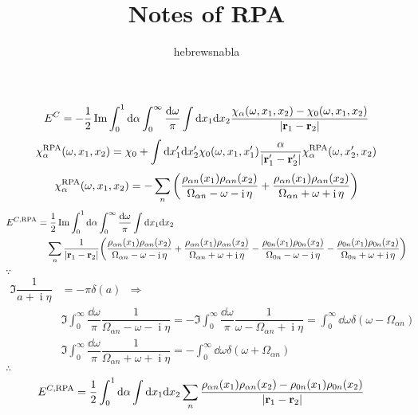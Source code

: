 \documentclass[a4paper]{article}
\title{Notes of RPA}
\author{hebrewsnabla}
\DeclareMathOperator{\I}{\mathrm{i}}
\DeclareMathOperator{\dra}{\;\Rightarrow\;}
\DeclareMathOperator{\RPA}{\mathrm{RPA}}
\numberwithin{equation}{section}
\begin{document}
\maketitle


\begin{equation}\label{key}
E^C = -\dfrac{1}{2}\Im \int_0^1 \dd\alpha \int_0^\infty \dfrac{\dd\omega}{\pi} \int \dd x_1\dd x_2 \dfrac{\chi_\alpha(\omega,x_1,x_2) - \chi_0(\omega,x_1,x_2)}{\abs{\vb{r}_1 - \vb{r}_2}}
\end{equation}
\begin{equation}\label{key}
\chi_\alpha^{\RPA}(\omega,x_1,x_2) = \chi_0 + \int \dd x_1'\dd x_2' \chi_0(\omega,x_1,x_1') \dfrac{\alpha}{\abs{\vb{r}_1' - \vb{r}_2'}} \chi_\alpha^{\RPA}(\omega,x_2',x_2)
\end{equation}
\begin{equation}\label{key}
\chi_\alpha^{\RPA}(\omega,x_1,x_2) = -\sum_n \qty(\dfrac{\rho_{\alpha n}(x_1) \rho_{\alpha n}(x_2)}{\Omega_{\alpha n} - \omega - \I\eta} + \dfrac{\rho_{\alpha n}(x_1) \rho_{\alpha n}(x_2)}{\Omega_{\alpha n} + \omega + \I\eta})
\end{equation}
\begin{align}
E^{C,\RPA} &= \dfrac{1}{2}\Im \int_0^1 \dd\alpha \int_0^\infty \dfrac{\dd\omega}{\pi} \int \dd x_1\dd x_2 \notag\\ 
& \quad \sum_n \dfrac{1}{\abs{\vb{r}_1 - \vb{r}_2}}\qty(\dfrac{\rho_{\alpha n}(x_1) \rho_{\alpha n}(x_2)}{\Omega_{\alpha n} - \omega - \I\eta} + \dfrac{\rho_{\alpha n}(x_1) \rho_{\alpha n}(x_2)}{\Omega_{\alpha n} + \omega + \I\eta} 
- \dfrac{\rho_{0 n}(x_1) \rho_{0 n}(x_2)}{\Omega_{0 n} - \omega - \I\eta} - \dfrac{\rho_{0 n}(x_1) \rho_{0 n}(x_2)}{\Omega_{0 n} + \omega + \I\eta})
\end{align}
$ \because $
\begin{align}
\Im \dfrac{1}{a + \I\eta} &= -\pi\delta(a) \;\dra\; \\
& \Im\int_0^\infty  \dfrac{\dd\omega}{\pi} \dfrac{1}{\Omega_{\alpha n} - \omega - \I\eta} = -\Im\int_0^\infty  \dfrac{\dd\omega}{\pi} \dfrac{1}{\omega - \Omega_{\alpha n} + \I\eta} = \int_0^\infty \dd\omega \delta(\omega - \Omega_{\alpha n})  \\
& \Im\int_0^\infty  \dfrac{\dd\omega}{\pi} \dfrac{1}{\Omega_{\alpha n} + \omega + \I\eta} = -\int_0^\infty \dd\omega \delta(\omega + \Omega_{\alpha n}) 
\end{align}
$ \therefore $
\begin{align}
E^{C,\RPA} &= \dfrac{1}{2} \int_0^1 \dd\alpha \int \dd x_1\dd x_2 \sum_n \dfrac{\rho_{\alpha n}(x_1) \rho_{\alpha n}(x_2)  - \rho_{0 n}(x_1) \rho_{0 n}(x_2)}{\abs{\vb{r}_1 - \vb{r}_2}} %
\end{align}
\end{document}

